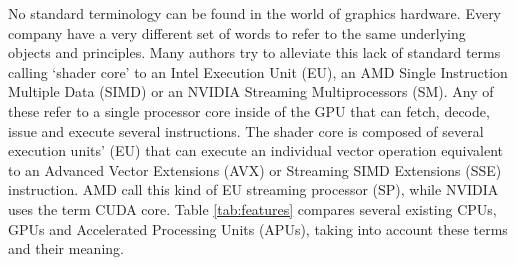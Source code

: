 \documentclass{comjnl}
\begin{document}
No standard terminology can be found in the world of graphics hardware.
Every company have a very different set of words to refer to the same underlying objects and principles. Many authors try to alleviate this lack of standard terms calling `shader core' to an Intel Execution Unit (EU), an AMD Single Instruction Multiple Data (SIMD) or an NVIDIA Streaming Multiprocessors (SM). Any of these refer to a single processor core inside of the GPU that can fetch, decode, issue and execute several instructions. The shader core is composed of several execution units' (EU) that can execute an individual vector operation equivalent to an Advanced Vector Extensions (AVX) or Streaming SIMD Extensions (SSE) instruction. AMD call this kind of EU streaming processor (SP), while NVIDIA uses the term CUDA core. Table \ref{tab:features} compares several existing CPUs, GPUs and Accelerated Processing Units (APUs), taking into account these terms and their meaning.
\end{document}
